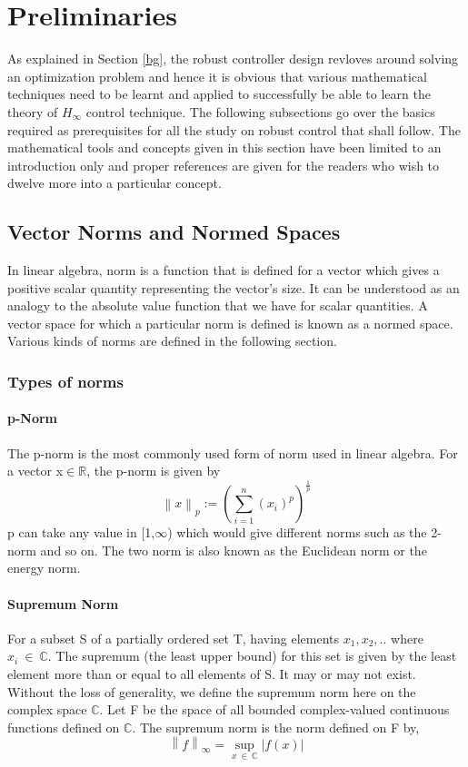 \documentclass[a4paper,12pt]{article}
\newcommand\norm[1]{\left\lVert#1\right\rVert}
\begin{document}
\section{Preliminaries}

As explained in Section \ref{bg}, the robust controller design revloves around solving an optimization problem and hence it is obvious that various mathematical techniques need to be learnt and applied to successfully be able to learn the theory of $H_{\infty}$ control technique. The following subsections go over the basics required as prerequisites for all the study on robust control that shall follow. The mathematical tools and concepts given in this section have been limited to an introduction only and proper references are given for the readers who wish to dwelve more into a particular concept. 
	\subsection{Vector Norms and Normed Spaces}
	In linear algebra, norm is a function that is defined for a vector which gives a positive scalar quantity representing the vector's size. It can be understood as an analogy to the absolute value function that we have for scalar quantities. A vector space for which  a particular norm is defined is known as a normed space. Various kinds of norms are defined in the following section.
		\subsubsection{Types of norms}
			\paragraph{p-Norm} The p-norm is the most commonly used form of norm used in linear algebra. For a vector x$\in \mathbb{R}$, the p-norm is given by
				\begin{equation}
					\norm{x}_{p} := \left(\sum\limits_{i=1}^n  (x_{i})^{p}\right)^{\frac{1}{p}}
				\end{equation}
				p can take any value in [1,$\infty$) which would give different norms such as the 2-norm and so on. The two norm is also known as the Euclidean norm or the energy norm.
			\paragraph{Supremum Norm} For a subset S of a partially ordered set T, having elements ${x_{1},x_{2},..}$ where $x_{i}\:\in \:\mathbb{C}$. The supremum (the least upper bound) for this set is given by the least element more than or equal to all elements of S. It may or may not exist. Without the loss of generality, we define the supremum norm here on the complex space $\mathbb{C}$. Let F be the space of all bounded complex-valued continuous functions defined on $\mathbb{C}$. The supremum norm is the norm defined on F by,
			\begin{equation}
				\norm{f}_{\infty}=\sup_{x\: \in \:\mathbb{C}} |f(x)|
			\end{equation}
		
\end{document}
